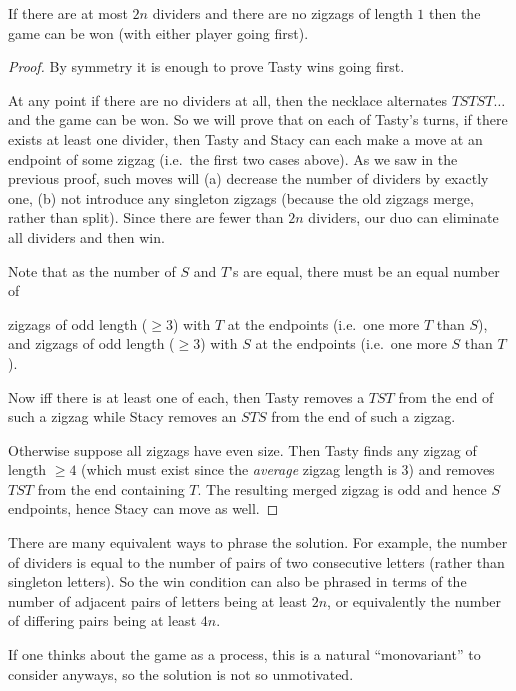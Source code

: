 \begin{claim*}
  If there are at most $2n$ dividers
  and there are no zigzags of length $1$
  then the game can be won (with either player going first).
\end{claim*}
\begin{proof}
  By symmetry it is enough to prove Tasty wins going first.

  At any point if there are no dividers at all,
  then the necklace alternates $TSTST\dots$
  and the game can be won.
  So we will prove that on each of Tasty's turns,
  if there exists at least one divider,
  then Tasty and Stacy can each make a move
  at an endpoint of some zigzag
  (i.e.\ the first two cases above).
  As we saw in the previous proof, such moves will
  (a) decrease the number of dividers by exactly one,
  (b) not introduce any singleton zigzags
  (because the old zigzags merge, rather than split).
  Since there are fewer than $2n$ dividers,
  our duo can eliminate all dividers and then win.

  Note that as the number of $S$ and $T$'s are equal,
  there must be an equal number of
  \begin{itemize}
    \ii zigzags of odd length ($\ge 3$) with $T$ at the endpoints
    (i.e.\ one more $T$ than $S$), and
    \ii zigzags of odd length ($\ge 3$) with $S$ at the endpoints
    (i.e.\ one more $S$ than $T$).
  \end{itemize}
  Now iff there is at least one of each,
  then Tasty removes a $TST$ from the end of such a zigzag
  while Stacy removes an $STS$ from the end of such a zigzag.

  Otherwise suppose all zigzags have even size.
  Then Tasty finds any zigzag of length $\ge 4$
  (which must exist since the \emph{average} zigzag length is $3$)
  and removes $TST$ from the end containing $T$.
  The resulting merged zigzag is odd and hence $S$ endpoints,
  hence Stacy can move as well.
\end{proof}

\begin{remark*}
  There are many equivalent ways to phrase the solution.
  For example, the number of dividers is equal to the
  number of pairs of two consecutive letters
  (rather than singleton letters).
  So the win condition can also be phrased in terms
  of the number of adjacent pairs of letters being at least $2n$,
  or equivalently the number of differing pairs being at least $4n$.

  If one thinks about the game as a process,
  this is a natural ``monovariant'' to consider anyways,
  so the solution is not so unmotivated.
\end{remark*}

